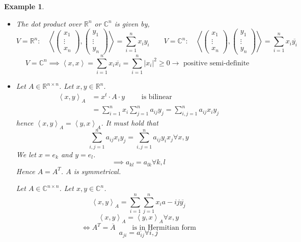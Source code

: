 \documentclass[a4paper]{article}
\newcounter{lecref}[section]
\numberwithin{lecref}{section}
\newtheorem{example}[lecref]{Example}
\newcommand{\angel}[1]{\left\langle#1\right\rangle}
\newcommand{\card}[1]{\left|#1\right|}
\begin{document}
\begin{example} %
  \begin{itemize}
    \item The dot product over $\mathbb R^n$ or $\mathbb C^n$ is given by,
      \[
        V = \mathbb R^n: \quad
        \angel{\begin{pmatrix} x_1 \\ \vdots \\ x_n \end{pmatrix}, \begin{pmatrix} y_1 \\ \vdots \\ y_n \end{pmatrix}}
        = \sum_{i=1}^n x_i y_i
        \qquad
        V = \mathbb C^n: \quad
        \angel{\begin{pmatrix} x_1 \\ \vdots \\ x_n \end{pmatrix}, \begin{pmatrix} y_1 \\ \vdots \\ y_n \end{pmatrix}}
        = \sum_{i=1}^n x_i \overline{y_i}
      \] \[
        V = \mathbb C^n \implies \angel{x, x} = \sum_{i=1}^n x_i \overline{x_i} = \sum_{i=1}^n \card{x_i}^2 \geq 0
        \to \text{ positive semi-definite }
      \]

    \item
      Let $A \in \mathbb R^{n \times n}$.
      Let $x, y \in \mathbb R^n$.
      \begin{align*}
        \angel{x, y}_A &= x^t \cdot A \cdot y \qquad \text{ is bilinear} \\
          &= \sum_{i=1}^n x_i \sum_{j=1}^n a_{ij} y_j = \sum_{i,j=1}^n a_{ij} x_i y_j
      \end{align*}
      hence $\angel{x, y}_A = \angel{y, x}_A$.
      It must hold that
      \[ \sum_{i,j=1}^n a_{ij} x_i y_j = \sum_{i,j=1}^n a_{ij} y_i x_j \forall x,y \]
      We let $x = e_k$ and $y = e_l$.
      \[ \implies a_{kl} = a_{lk} \forall k,l \]
      Hence $A = A^T$. $A$ is symmetrical.

      Let $A \in \mathbb C^{n \times n}$. Let $x, y \in \mathbb C^n$.
      \[ \angel{x, y}_A = \sum_{i=1}^n \sum_{j=1}^n x_i a-{ij} \overline{y_j} \]
      \[ \angel{x,y}_A = \angel{y,x}_A \forall x,y \]
      \[ \iff A^T = \overline{A} \qquad \text{ is in Hermitian form} \]
      \[ a_{ji} = \overline{a_{ij}} \forall i ,j \]


\end{itemize}
\end{example}
\end{document}
